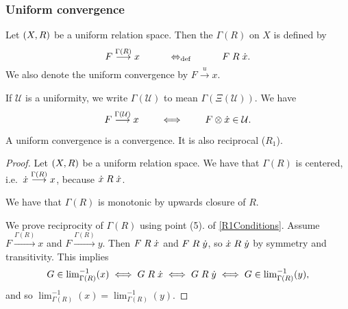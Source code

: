 \subsubsection{Uniform convergence}
\begin{definition}
Let $\sSet{X,R}$ be a uniform relation space. Then the  $\Gamma(R)$ on $X$ is defined by
\[ F \overset{\Gamma(R)}{\longrightarrow} x \qquad\quad\Leftrightarrow_{\text{def}}\quad\qquad F\mathrel{R}\dot{x}. \]
We also denote the uniform convergence by $F\overset{u}{\longrightarrow} x$.
\end{definition}
If $\mathcal{U}$ is a uniformity, we write $\Gamma(\mathcal{U})$ to mean $\Gamma(\Xi(\mathcal{U}))$. We have
\[ F \overset{\Gamma(\mathcal{U})}{\longrightarrow} x \qquad\iff\qquad F\otimes \dot{x}\in\mathcal{U}. \]

\begin{lemma} \label{associatedUniformConvergence}
A uniform convergence is a convergence. It is also reciprocal ($R_1$).
\end{lemma}
\begin{proof}
Let $\sSet{X,R}$ be a uniform relation space. We have that $\Gamma(R)$ is centered, i.e.\ $\dot{x} \overset{\Gamma(R)}{\longrightarrow} x$, because $\dot{x}\mathrel{R}\dot{x}$.

We have that $\Gamma(R)$ is monotonic by upwards closure of $R$.

We prove reciprocity of $\Gamma(R)$ using point (5). of \ref{R1Conditions}. Assume $F \overset{\Gamma(R)}{\longrightarrow} x$ and $F \overset{\Gamma(R)}{\longrightarrow} y$. Then $F\mathrel{R}\dot{x}$ and $F\mathrel{R}\dot{y}$, so $\dot{x}\mathrel{R}\dot{y}$ by symmetry and transitivity. This implies
\[ G \in {\lim}_{\Gamma(R)}^{-1}(x) \iff G\mathrel{R}\dot{x}\iff G\mathrel{R}\dot{y} \iff G\in {\lim}_{\Gamma(R)}^{-1}(y), \]
and so $\lim_{\Gamma(R)}^{-1}(x) = \lim_{\Gamma(R)}^{-1}(y)$.
\end{proof}

